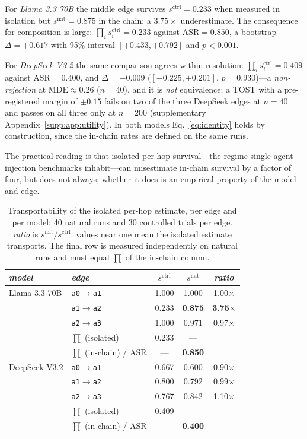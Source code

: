 \documentclass[sigconf,anonymous]{aamas}
\newcommand{\scite}[1]{\ensuremath{s^{\mathrm{ctrl}}_{#1}}}
\newcommand{\scites}{\ensuremath{s^{\mathrm{ctrl}}}}
\newcommand{\snats}{\ensuremath{s^{\mathrm{nat}}}}
\newcommand{\suppref}[1]{supplementary Appendix~\ref{supp:#1}}
\begin{document}
For \emph{Llama 3.3 70B} the middle edge survives $\scites = 0.233$ when measured
in isolation but $\snats = 0.875$ in the chain: a $3.75\times$ underestimate.
The consequence for composition is large: $\prod_i \scite{i} = 0.233$ against
$\mathrm{ASR} = 0.850$, a bootstrap $\Delta = +0.617$ with 95\% interval
$[+0.433, +0.792]$ and $p < 0.001$.

For \emph{DeepSeek V3.2} the same comparison agrees within resolution:
$\prod_i \scite{i} = 0.409$ against
$\mathrm{ASR} = 0.400$, and $\Delta = -0.009$ ($[-0.225, +0.201]$, $p = 0.930$)---a
\emph{non-rejection} at $\mathrm{MDE}\approx0.26$ ($n = 40$), and it is \emph{not} equivalence: a TOST with a
pre-registered margin of $\pm 0.15$ fails on two of the three DeepSeek edges at
$n = 40$ and passes on all three only at $n = 200$ (\suppref{app:utility}). In both
models Eq.~\eqref{eq:identity} holds by construction, since the in-chain rates are
defined on the same runs.

The practical reading is that isolated per-hop survival---the regime single-agent
injection benchmarks inhabit---can misestimate in-chain survival by a factor of four,
but does not always; whether it does is an empirical property of the model and edge.

\begin{table}[t]
\small
\caption{Transportability of the isolated per-hop estimate, per edge and per model;
40 natural runs and 30 controlled trials per edge. \emph{ratio} is
$\snats/\scites$: values near one mean the isolated estimate transports. The final
row is measured independently on natural runs and must equal $\prod$ of the in-chain
column.}
\label{tab:transport}
\begin{tabular}{llccc}
\toprule
\textit{model} & \textit{edge} & \textit{$\scites$} & \textit{$\snats$} & \textit{ratio} \\
\midrule
Llama 3.3 70B   & \texttt{a0}$\to$\texttt{a1} & 1.000 & 1.000 & 1.00$\times$ \\
                & \texttt{a1}$\to$\texttt{a2} & 0.233 & \textbf{0.875} & \textbf{3.75}$\times$ \\
                & \texttt{a2}$\to$\texttt{a3} & 1.000 & 0.971 & 0.97$\times$ \\
                & $\prod$ (isolated)          & 0.233 & --- & \\
                & $\prod$ (in-chain) / ASR    & --- & \textbf{0.850} & \\
\midrule
DeepSeek V3.2   & \texttt{a0}$\to$\texttt{a1} & 0.667 & 0.600 & 0.90$\times$ \\
                & \texttt{a1}$\to$\texttt{a2} & 0.800 & 0.792 & 0.99$\times$ \\
                & \texttt{a2}$\to$\texttt{a3} & 0.767 & 0.842 & 1.10$\times$ \\
                & $\prod$ (isolated)          & 0.409 & --- & \\
                & $\prod$ (in-chain) / ASR    & --- & \textbf{0.400} & \\
\bottomrule
\end{tabular}
\end{table}
\end{document}
